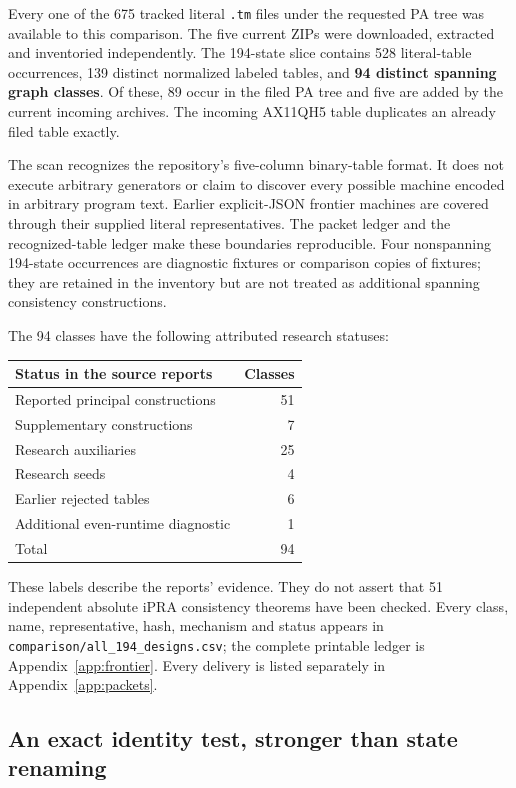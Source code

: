 \documentclass[11pt,letterpaper]{article}
\newcommand{\file}[1]{\texttt{\nolinkurl{#1}}}
\begin{document}
Every one of the 675 tracked literal \file{.tm} files under the requested
PA tree was available to this comparison. The five current ZIPs were
downloaded, extracted and inventoried independently. The 194-state slice
contains 528 literal-table occurrences, 139 distinct normalized labeled
tables, and \textbf{94 distinct spanning graph classes}. Of these, 89 occur
in the filed PA tree and five are added by the current incoming archives.
The incoming AX11QH5 table duplicates an already filed table exactly.

The scan recognizes the repository's five-column binary-table format.
It does not execute arbitrary generators or claim to discover every
possible machine encoded in arbitrary program text. Earlier explicit-JSON
frontier machines are covered through their supplied literal representatives.
The packet ledger and the recognized-table ledger make these boundaries
reproducible. Four nonspanning 194-state occurrences are diagnostic fixtures
or comparison copies of fixtures; they are retained in the inventory but
are not treated as additional spanning consistency constructions.

The 94 classes have the following attributed research statuses:
\begin{center}
\begin{tabular}{@{}lr@{}}
\toprule Status in the source reports & Classes\\\midrule
Reported principal constructions & 51\\
Supplementary constructions & 7\\
Research auxiliaries & 25\\
Research seeds & 4\\
Earlier rejected tables & 6\\
Additional even-runtime diagnostic & 1\\\midrule
Total & 94\\\bottomrule
\end{tabular}
\end{center}
These labels describe the reports' evidence. They do not assert that 51
independent absolute iPRA consistency theorems have been checked. Every
class, name, representative, hash, mechanism and status appears in
\file{comparison/all_194_designs.csv}; the complete printable ledger is
Appendix~\ref{app:frontier}. Every delivery is listed separately in
Appendix~\ref{app:packets}.

\subsection{An exact identity test, stronger than state renaming}
\end{document}

